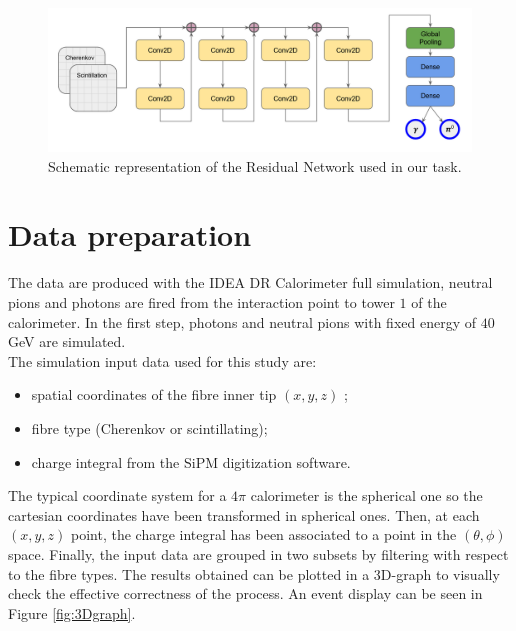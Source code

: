 \begin{figure}
	\centering
	\includegraphics[width=.8\textwidth]{IMG/Cap6/Res_our_scheme.png}
	\caption{Schematic representation of the Residual Network used in our task.}
	\label{fig:Res_our_scheme}
\end{figure}

\section{Data preparation}\label{sec:NN_data}
The data are produced with the IDEA DR Calorimeter full simulation, neutral pions and photons are fired from the interaction point to tower $1$ of the calorimeter. In the first step, photons and neutral pions with fixed energy of $40$ GeV are simulated.\\
The simulation input data used for this study are:
\begin{itemize}
    \item spatial coordinates of the fibre inner tip $(x, y, z)$%
    ;
    \item fibre type (Cherenkov or scintillating);
    \item charge integral from the SiPM digitization software.
\end{itemize}
The typical coordinate system for a $4\pi$ calorimeter is the spherical one so the cartesian coordinates have been transformed in spherical ones. Then, at each $(x, y, z)$ point, the charge integral has been associated to a point in the $(\theta,\phi)$ space. Finally, the input data are grouped in two subsets by filtering with respect to the fibre types. The results obtained can be plotted in a 3D-graph to visually check the effective correctness of the process. An event display can be seen in Figure \ref{fig:3Dgraph}.


